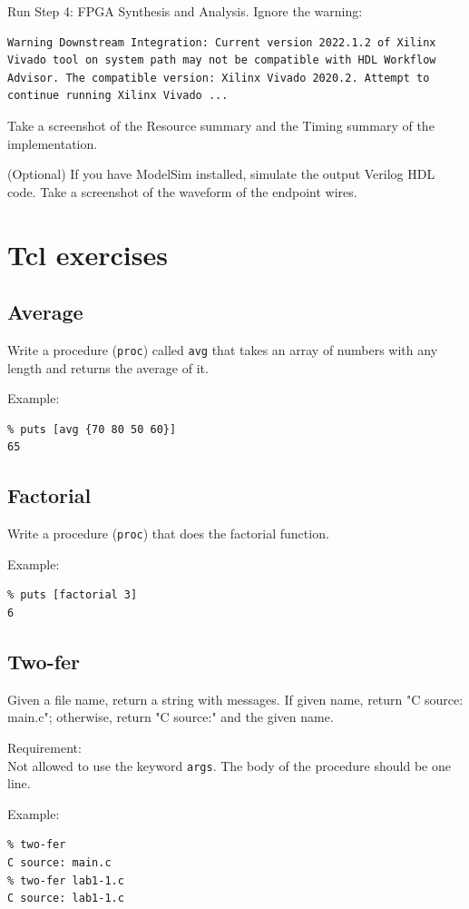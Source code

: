 \documentclass[a4paper,12pt,twoside]{article}
\begin{document}
Run Step 4: FPGA Synthesis and Analysis. Ignore the warning:
\begin{verbatim}
Warning Downstream Integration: Current version 2022.1.2 of Xilinx Vivado tool on system path may not be compatible with HDL Workflow Advisor. The compatible version: Xilinx Vivado 2020.2. Attempt to continue running Xilinx Vivado ...
\end{verbatim}
Take a screenshot of the Resource summary and the Timing summary of the implementation.

(Optional) If you have ModelSim installed, simulate the output Verilog HDL code. Take a screenshot of the waveform of the endpoint wires.

\newpage
\section{Tcl exercises}\label{STcl}
\subsection{Average}
Write a procedure (\texttt{proc}) called \texttt{avg} that takes an array of numbers with any length and returns the average of it.

Example:
\begin{verbatim}
% puts [avg {70 80 50 60}]
65
\end{verbatim}
\subsection{Factorial}
Write a procedure (\texttt{proc}) that does the factorial function.

Example:
\begin{verbatim}
% puts [factorial 3]
6
\end{verbatim}
\subsection{Two-fer}
Given a file name, return a string with messages. If given name, return "C source: main.c"; otherwise, return "C source:" and the given name.

Requirement:\\
Not allowed to use the keyword \texttt{args}. The body of the procedure should be one line.

Example:
\begin{verbatim}
% two-fer
C source: main.c
% two-fer lab1-1.c
C source: lab1-1.c
\end{verbatim}
\end{document}
